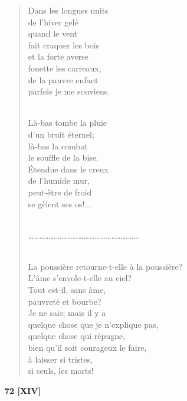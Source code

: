 \documentclass[a4paper,11pt]{book}
\begin{document}
\begin{verse}
Dans les longues nuits \\
de l'hiver gelé \\
quand le vent \\
fait craquer les bois \\
et la forte averse \\
fouette les carreaux, \\
de la pauvre enfant \\
parfois je me souviens. \\ \

Là-bas tombe la pluie \\
d'un bruit éternel; \\
là-bas la combat \\
le souffle de la bise. \\
Étendue dans le creux \\
de l'humide mur, \\
peut-être de froid \\
se gèlent ses os!... \\ \

\ldots\ldots\ldots\ldots\ldots\ldots\ldots\ldots\ldots\ldots\ldots\ldots\ldots\ldots\ldots\ldots\ldots\ldots\ldots\ldots \\ \

La poussière retourne-t-elle à la poussière? \\
L'âme s'envole-t-elle au ciel? \\
Tout est-il, sans âme, \\
pauvreté et bourbe? \\
Je ne sais; mais il y a \\
quelque chose que je n'explique pas, \\
quelque chose qui répugne, \\
bien qu'il soit courageux le faire, \\
à laisser si tristes, \\
si seuls, les morts! \\
\end{verse}

\bigskip

\begin{center} {\bf 72 [XIV]} \end{center}
\end{document}

